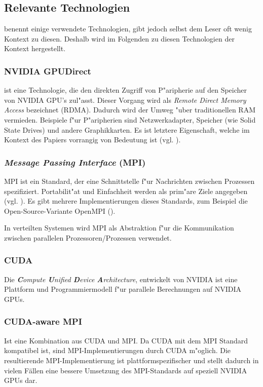 \subsection{Relevante Technologien}
\cite{mainpaper} benennt einige verwendete Technologien, gibt jedoch selbst dem Leser oft wenig Kontext zu diesen. Deshalb wird im Folgenden zu diesen Technologien der Kontext hergestellt.

\subsubsection{ NVIDIA GPUDirect }
	ist eine Technologie, die den direkten Zugriff von P"aripherie auf den Speicher von NVIDIA GPU's zul"asst. Dieser Vorgang wird als \textit{Remote Direct Memory Access} bezeichnet (RDMA).
		Dadurch wird der Umweg "uber traditionellen RAM vermieden. Beispiele f"ur P"aripherien sind Netzwerkadapter, Speicher (wie Solid State Drives) und andere Graphikkarten. Es ist letztere Eigenschaft, welche im Kontext des Papiers vorrangig von Bedeutung ist (vgl. \cite{gpud}).

\subsubsection{ \textit{Message Passing Interface} (MPI) }
MPI ist ein Standard, der eine Schnittstelle f"ur Nachrichten zwischen Prozessen spezifiziert. Portabilit"at und Einfachheit werden als prim"are Ziele angegeben (vgl. \cite[Kap. 1.1]{mpi}). Es gibt mehrere Implementierungen dieses Standards, zum Beispiel die Open-Source-Variante OpenMPI (\cite{openmpi}).

In verteilten Systemen wird MPI als Abstraktion f"ur die Kommunikation zwischen parallelen Prozessoren/Prozessen verwendet.

\subsubsection{ CUDA }
Die \textit{\textbf{C}ompute \textbf{U}nified \textbf{D}evice \textbf{A}rchitecture}, entwickelt von NVIDIA ist eine Plattform und Programmiermodell f"ur parallele Berechnungen auf NVIDIA GPUs. 

\subsubsection{ CUDA-aware MPI }
Ist eine Kombination aus CUDA und MPI. Da CUDA mit dem MPI Standard kompatibel ist, sind MPI-Implementierungen durch CUDA m"oglich. Die resultierende MPI-Implementierung ist plattformspezifischer und stellt dadurch in vielen Fällen eine bessere Umsetzung des MPI-Standards auf speziell NVIDIA GPUs dar.

